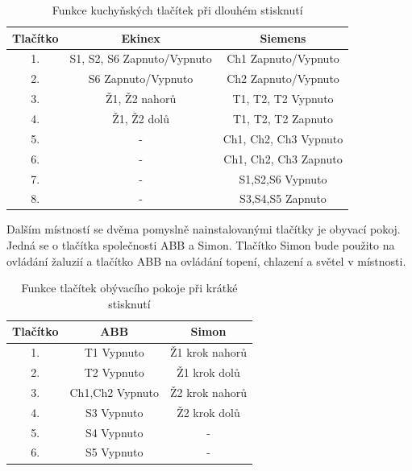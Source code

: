 \begin{table}[h]
 \caption[Funkce kuchyňských tlačítek při dlouhém stisknutí]{Funkce kuchyňských tlačítek při dlouhém stisknutí}
   \small
    \centering
	  \begin{tabular}{|c|c|c|}
	    \hline
	    Tlačítko & Ekinex & Siemens  \\
	    \hline\hline
	    1. & S1, S2, S6 Zapnuto/Vypnuto &  Ch1 Zapnuto/Vypnuto \\
	    \hline
        2. & S6 Zapnuto/Vypnuto &  Ch2 Zapnuto/Vypnuto \\
	    \hline
        3. &  Ž1, Ž2 nahorů & T1, T2, T2 Vypnuto \\
	    \hline
        4. & Ž1, Ž2 dolů & T1, T2, T2 Zapnuto \\
	    \hline
        5. & - &  Ch1, Ch2, Ch3 Vypnuto\\
	    \hline 
        6. & - & Ch1, Ch2, Ch3 Zapnuto \\
	    \hline 
	    7. & - & S1,S2,S6 Vypnuto \\
	    \hline
	    8. & - & S3,S4,S5 Zapnuto \\
	    \hline
	  \end{tabular}
\end{table}

\newpage Dalším místností se dvěma pomyslně nainstalovanými tlačítky je obyvací pokoj. Jedná se o tlačítka společnosti ABB a Simon. Tlačítko Simon bude použito na ovládání žaluzií a tlačítko ABB na ovládání topení, chlazení a světel v místnosti.

\begin{table}[h]
 \caption[Funkce tlačítek obývacího pokoje při krátké stisknutí]{Funkce tlačítek obývacího pokoje při krátké stisknutí}
   \small
    \centering
	  \begin{tabular}{|c|c|c|}
	    \hline
	    Tlačítko & ABB & Simon  \\
	    \hline\hline
	    1. & T1 Vypnuto & Ž1 krok nahorů  \\
	    \hline
        2. & T2 Vypnuto & Ž1 krok dolů  \\
	    \hline
        3. & Ch1,Ch2 Vypnuto & Ž2 krok nahorů  \\
	    \hline
        4. & S3 Vypnuto & Ž2 krok dolů  \\
	    \hline
        5. & S4 Vypnuto & - \\
	    \hline 
        6. & S5 Vypnuto & - \\
	    \hline 
	  \end{tabular}
\end{table}

